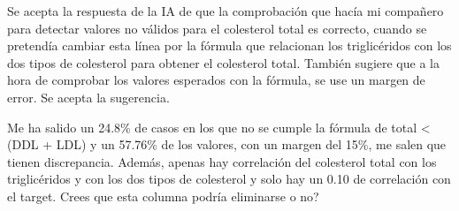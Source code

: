 \documentclass[12pt,a4paper,oneside]{book}
\begin{document}
\begin{iaanalisis}
Se acepta la respuesta de la IA de que la comprobación que hacía mi compañero para detectar valores no válidos para el colesterol total es correcto, cuando se pretendía cambiar esta línea por la fórmula que relacionan los triglicéridos con los dos tipos de colesterol para obtener el colesterol total. También sugiere que a la hora de comprobar los valores esperados con la fórmula, se use un margen de error. Se acepta la sugerencia.
\end{iaanalisis}




\begin{iaprompt}
Me ha salido un 24.8\% de casos en los que no se cumple la fórmula de total < (DDL + LDL) y un 57.76\% de los valores, con un margen del 15\%, me salen que tienen discrepancia. Además, apenas hay correlación del colesterol total con los triglicéridos y con los dos tipos de colesterol y solo hay un 0.10 de correlación con el target. Crees que esta columna podría eliminarse o no?
\end{iaprompt}
\end{document}
